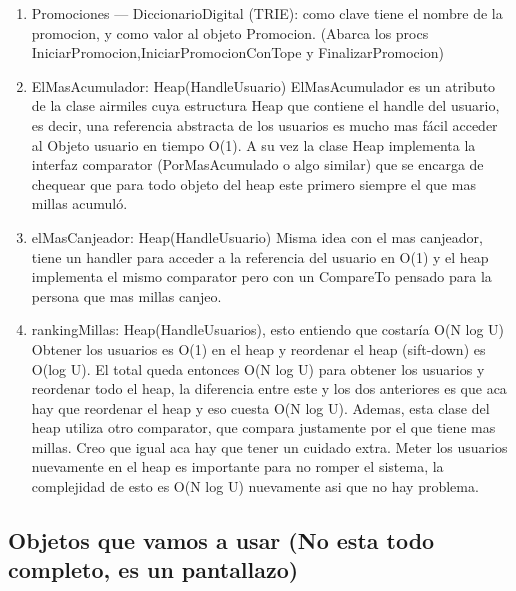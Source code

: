\documentclass[11pt,a4paper]{article}
\begin{document}
\begin{enumerate}
	\item Promociones --- DiccionarioDigital (TRIE): como clave tiene el nombre de la promocion, y como valor al objeto Promocion. (Abarca los procs IniciarPromocion,IniciarPromocionConTope y FinalizarPromocion)
	\item ElMasAcumulador: Heap(HandleUsuario) ElMasAcumulador es  un atributo de la clase airmiles cuya estructura Heap que contiene el handle del usuario, es decir, una referencia abstracta de los usuarios es mucho mas fácil acceder al Objeto usuario en tiempo O(1). A su vez la clase Heap implementa la interfaz comparator (PorMasAcumulado o algo similar) que se encarga de chequear que para todo objeto del heap este primero siempre el que mas millas acumuló.
	\item elMasCanjeador: Heap(HandleUsuario) Misma idea con el mas canjeador, tiene un handler para acceder a la referencia del usuario en O(1) y el heap implementa el mismo comparator pero con un CompareTo pensado para la persona que mas millas canjeo. 
	\item rankingMillas: Heap(HandleUsuarios), esto entiendo que costaría O(N log U) Obtener los usuarios es O(1) en el heap y reordenar el heap (sift-down) es O(log U). El total queda entonces O(N log U) para obtener los usuarios y reordenar todo el heap, la diferencia entre este y los dos anteriores es que aca hay que reordenar el heap y eso cuesta O(N log U). Ademas, esta clase del heap utiliza otro comparator, que compara justamente por el que tiene mas millas. Creo que igual aca hay que tener un cuidado extra. Meter los usuarios nuevamente en el heap es importante para no romper el sistema, la complejidad de esto es O(N log U) nuevamente asi que no hay problema.

\end{enumerate}


\subsection{Objetos que vamos a usar (No esta todo completo, es un pantallazo)}
\end{document}

